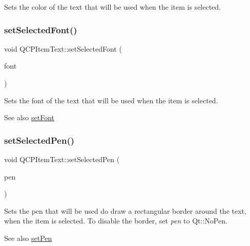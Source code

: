 Sets the color of the text that will be used when the item is selected. \mbox{\label{class_q_c_p_item_text_a0be2841772f83663c4db307928b82816}} 
\subsubsection{\texorpdfstring{setSelectedFont()}{setSelectedFont()}}
{\footnotesize\ttfamily void Q\+C\+P\+Item\+Text\+::set\+Selected\+Font (\begin{DoxyParamCaption}\item[{const Q\+Font \&}]{font }\end{DoxyParamCaption})}

Sets the font of the text that will be used when the item is selected.

\begin{DoxySeeAlso}{See also}
\mbox{\hyperlink{class_q_c_p_item_text_a94ad60ebe04f5c07c35e7c2029e96b1f}{set\+Font}} 
\end{DoxySeeAlso}
\mbox{\label{class_q_c_p_item_text_a291febe586f0da3f1c392e77bef4aa20}} 
\subsubsection{\texorpdfstring{setSelectedPen()}{setSelectedPen()}}
{\footnotesize\ttfamily void Q\+C\+P\+Item\+Text\+::set\+Selected\+Pen (\begin{DoxyParamCaption}\item[{const Q\+Pen \&}]{pen }\end{DoxyParamCaption})}

Sets the pen that will be used do draw a rectangular border around the text, when the item is selected. To disable the border, set {\itshape pen} to Qt\+::\+No\+Pen.

\begin{DoxySeeAlso}{See also}
\mbox{\hyperlink{class_q_c_p_item_text_a9b9ec6eea0eb0603977ff84d4c78d0a3}{set\+Pen}} 
\end{DoxySeeAlso}
\mbox{\label{class_q_c_p_item_text_a3dacdda0ac88f99a05b333b977c48747}} 
